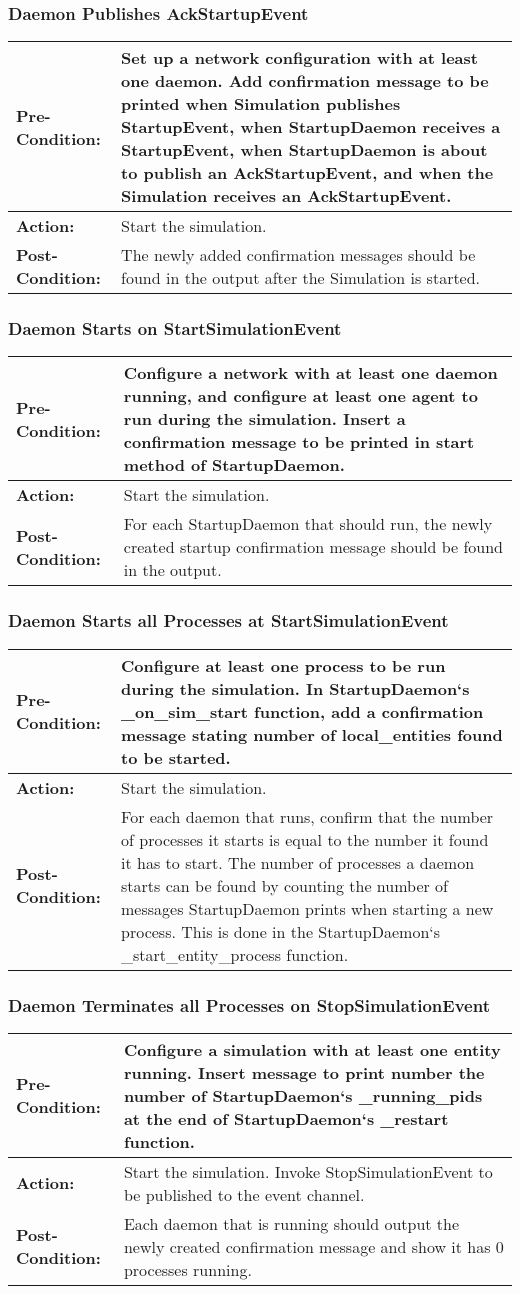 \documentclass[titlepage]{article}
\newcommand{\testcase}[3]{
    \begin{center}
    \begin{tabular}{| l | p{0.7\textwidth}|}
        \hline
        \rowcolor[gray]{0.8}\textbf{Pre-Condition:} & #1 \\ \hline
        \textbf{Action:} & #2 \\ \hline
        \rowcolor[gray]{0.8}\textbf{Post-Condition:} & #3 \\ \hline
    \end{tabular}
    \end{center}
}
\begin{document}
\subsubsection{Daemon Publishes AckStartupEvent}
\testcase{Set up a network configuration with at least one daemon.  Add confirmation message to be printed when Simulation publishes StartupEvent, when StartupDaemon receives a StartupEvent, when StartupDaemon is about to publish an AckStartupEvent, and when the Simulation receives an AckStartupEvent.}{Start the simulation.}{The newly added confirmation messages should be found in the output after the Simulation is started.}

\subsubsection{Daemon Starts on StartSimulationEvent}
\testcase{Configure a network with at least one daemon running, and configure at least one agent to run during the simulation.  Insert a confirmation message to be printed in start method of StartupDaemon.}{Start the simulation.}{For each StartupDaemon that should run, the newly created startup confirmation message should be found in the output.}

\subsubsection{Daemon Starts all Processes at StartSimulationEvent}
\testcase{Configure at least one process to be run during the simulation.  In StartupDaemon`s _on_sim_start function, add a confirmation message stating number of local_entities found to be started.}{Start the simulation.}{For each daemon that runs, confirm that the number of processes it starts is equal to the number it found it has to start.  The number of processes a daemon starts can be found by counting the number of messages StartupDaemon prints when starting a new process.  This is done in the StartupDaemon`s _start_entity_process function.}

\subsubsection{Daemon Terminates all Processes on StopSimulationEvent}
\testcase{Configure a simulation with at least one entity running.  Insert message to print number the number of StartupDaemon`s _running_pids at the end of StartupDaemon`s _restart function.}{Start the simulation. Invoke StopSimulationEvent to be published to the event channel.}{Each daemon that is running should output the newly created confirmation message and show it has 0 processes running.}
\end{document}
